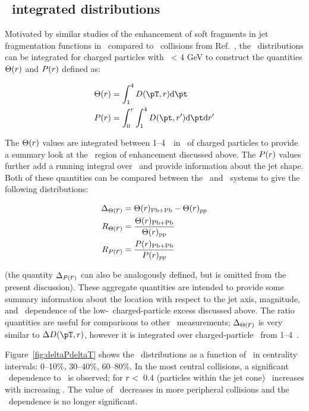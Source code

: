 \subsection{\pt\ integrated distributions}
\label{sec:discussion_int}
Motivated by similar studies of the enhancement of soft fragments in 
jet fragmentation functions in \pbpb\ compared to \pp\ collisions from Ref.~\cite{Aaboud:2018hpb}, the \Dptr\ distributions can be integrated for charged particles with \pt\ < 4 GeV to construct the quantities $\Theta(\mbox{$r$})$ and $P(\mbox{$r$})$ defined as:

\begin{align*}
   \Theta(\rvar) &= \int_1^{4} \Dptr  \fd \pt \\
   P(\rvar) &= \int_0^r \int_1^{4} D(\pt, r') \fd \pt \fd r'
\end{align*}

The $\Theta(\mbox{$r$})$ values are integrated between 1--4~\GeV\ in \pt\ of charged particles to provide a summary look at
the \pt\ region of enhancement discussed above.  The $P(\mbox{$r$})$ values further add a running integral over \rvar\
and provide information about the jet shape.
Both of these quantities can be compared between the \pp\ and \pbpb\ systems to give the following distributions:

\begin{align*}
   \Delta_{\Theta(\mbox{$r$})} &= \Theta(\mbox{$r$})_{\mathrm{Pb+Pb}} - \Theta(\mbox{$r$})_{pp} \\
   R_{\Theta(\mbox{$r$})} &= \frac{\Theta(\mbox{$r$})_{\mathrm{Pb+Pb}}}{\Theta(\mbox{$r$})_{\mathrm{pp}}} \\
   R_{P(\mbox{$r$})} &= \frac{P(\mbox{$r$})_{\mathrm{Pb+Pb}}}{P(\mbox{$r$})_{pp}}
\end{align*}

(the quantity $\Delta_{P(\mbox{$r$})}$ can also be analogously defined, but is omitted from the present discussion).
These aggregate quantities are intended to provide some summary information about the location with respect to the 
jet axis, magnitude, and \ptjet\ dependence of the low-\pt\ charged-particle excess discussed above.
The ratio quantities are useful for comparisons to other \pbpb\ measurements; $\Delta_{\Theta(\mbox{$r$})}$ is very similar 
to $\DeltaDptr$, however it is integrated over charged-particle \pt\ from 1--4~\GeV.

Figure~\ref{fig:deltaPdeltaT} shows the \DeltaTheta\ distributions as a function of \rvar\ in centrality intervals: 0--10\%, 30--40\%, 60--80\%.
In the most central collisions, a significant \ptjet\ dependence to \DeltaTheta\ is observed; for $\mbox{$r$} <$~0.4 (particles
within the jet cone) \DeltaTheta\ increases with increasing \ptjet.
The value of \DeltaTheta\ decreases in more peripheral collisions and the \ptjet\ dependence is no longer significant.

